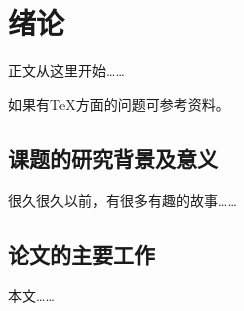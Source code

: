 \chapter{绪论}
\label{chap:introduction}

正文从这里开始……

如果有TeX方面的问题可参考资料\cite{tex,companion}。

\section{课题的研究背景及意义}

很久很久以前，有很多有趣的故事\cite{cnproceed,cnarticle,zhubajie,shaheshang}……

\section{论文的主要工作}

本文……
